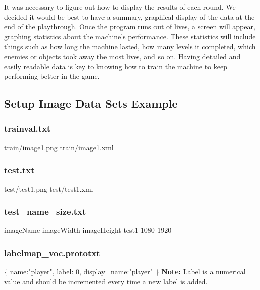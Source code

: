 \documentclass[onecolumn, draftclsnofoot,10pt, compsoc]{IEEEtran}
\begin{document}
It was necessary to figure out how to display the results of each round.
We decided it would be best to have a summary, graphical display of the data at the end of the playthrough.
Once the program runs out of lives, a screen will appear, graphing statistics about the machine's performance.
These statistics will include things such as how long the machine lasted, how many levels it completed, which enemies or objects took away the most lives, and so on.
Having detailed and easily readable data is key to knowing how to train the machine to keep performing better in the game.


\newpage

\subsection{Setup Image Data Sets Example}\label{sssec:num33}

\subsubsection{trainval.txt}
train/image1.png train/image1.xml

\subsubsection{test.txt}
test/test1.png test/test1.xml

\subsubsection{test_name_size.txt}
imageName imageWidth imageHeight\newline
test1     1080       1920

\subsubsection{labelmap_voc.prototxt}
\{\newline
name:"player",\newline
label: 0,\newline
display_name:"player"\newline
\}\newline
\textbf{Note:} Label is a numerical value and should be incremented every time a new label is added.
\end{document}
